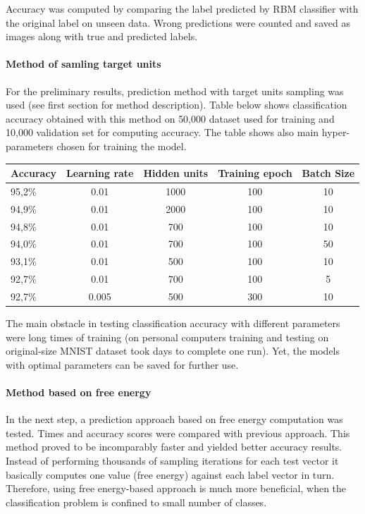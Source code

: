 \documentclass[a4paper]{scrartcl}
\begin{document}
\par Accuracy was computed by comparing the label predicted by RBM classifier with the original label on unseen data. Wrong predictions were counted and saved as images along with true and predicted labels. 
\paragraph{Method of samling target units} For the preliminary results, prediction method with target units sampling was used (see first section for method description). Table below shows classification accuracy obtained with this method on 50,000 dataset used for training and 10,000 validation set for computing accuracy. The table shows also main hyper-parameters chosen for training the model.
\begin{center}
\hspace{1cm}
\begin{tabular}{|l||c|c|c|c|} \hline
Accuracy & Learning rate & Hidden units & Training epoch & Batch Size
\\ \hline
95,2\% & 0.01 & 1000 & 100 & 10
\\ \hline
94,9\% & 0.01 & 2000 & 100 & 10
\\ \hline
94,8\% & 0.01 & 700 & 100 & 10
\\ \hline
94,0\% & 0.01 & 700 & 100 & 50
\\ \hline
93,1\% & 0.01 & 500 & 100 & 10
\\ \hline
92,7\% & 0.01 & 700 & 100 & 5
\\ \hline
92,7\% & 0.005 & 500 & 300 & 10
\\ \hline \end{tabular}
\end{center}

The main obstacle in testing classification accuracy with different parameters were long times of training (on personal computers training and testing on original-size MNIST dataset took days to complete one run). Yet, the models with optimal parameters can be saved for further use.
\paragraph{Method based on free energy} In the next step, a prediction approach based on free energy computation was tested. Times and accuracy scores were compared with previous approach. This method proved to be incomparably faster and yielded better accuracy results. Instead of performing thousands of sampling iterations for each test vector it basically computes one value (free energy) against each label vector in turn. Therefore, using free energy-based approach is much more beneficial, when the classification problem is confined to small number of classes. 
\end{document}
